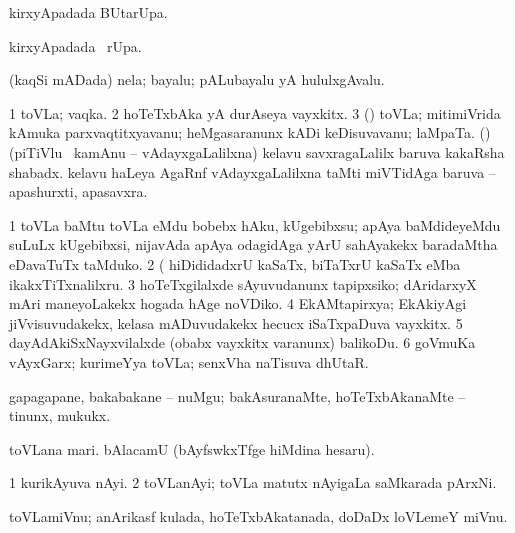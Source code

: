 \bentry
{} 
\gl{\kirx}
\expl{}
\bmng
{} kirxyApadada BUtarUpa. 
\emng
\eentry

\bentry
{} 
\gl{\kirx}
\expl{}
\bmng
{} kirxyApadada \BUkaq\ rUpa. 
\emng
\eentry

\bentry
{} 
\gl{\nA}
\expl{}
\bmng
(kaqSi mADada) nela; bayalu; pALubayalu yA hululxgAvalu. 
\emng
\eentry

\bentry
{} 
\gl{\nA}
\bmng
\bnum
\num{1} toVLa; vaqka. 
\num{2} hoTeTxbAka yA durAseya vayxkitx. 
\num{3} (\ashi) toVLa; mitimiVrida kAmuka parxvaqtitxyavanu; heMgasaranunx kADi keDisuvavanu; laMpaTa. 
 (\saM) 
\banum
{} (piTiVlu \mo\ kamAnu -- vAdayxgaLalilxna) kelavu savxragaLalilx baruva kakaRsha shabadx. 
 kelavu haLeya AgaRnf vAdayxgaLalilxna taMti miVTidAga baruva -- apashurxti, apasavxra. 
\eanum
\numie
\enum
\emng

\noindent
\gl{\pagu}
\expl{}
\bmng
\bnum
\num{1}  toVLa baMtu toVLa eMdu bobebx hAku, kUgebibxsu; apAya baMdideyeMdu suLuLx kUgebibxsi, nijavAda apAya odagidAga yArU sahAyakekx baradaMtha eDavaTuTx taMduko. 
\num{2}  (  hiDididadxrU kaSaTx, biTaTxrU kaSaTx eMba ikakxTiTxnalilxru. 
\num{3}  hoTeTxgilalxde sAyuvudanunx tapipxsiko; dAridarxyX mAri maneyoLakekx hogada hAge noVDiko. 
\num{4}  EkAMtapirxya; EkAkiyAgi jiVvisuvudakekx, kelasa mADuvudakekx hecucx iSaTxpaDuva vayxkitx. 
\num{5}  dayAdAkiSxNayxvilalxde (obabx vayxkitx \mo varanunx) balikoDu. 
\num{6}  goVmuKa vAyxGarx; kurimeYya toVLa; senxVha naTisuva dhUtaR. 
\enum
\emng
\eentry

\bentry
{} 
\gl{\sakirx}
\expl{}
\bmng
gapagapane, bakabakane -- nuMgu; bakAsuranaMte, hoTeTxbAkanaMte -- tinunx, mukukx. 
\emng
\eentry

\bentry
{} 
\gl{\nA}
\expl{}
\bmng
\banum
{} toVLana mari. 
 bAlacamU (bAyfswkxTfge hiMdina hesaru). 
\eanum
\emng
\eentry

\bentry
{} 
\gl{\nA}
\expl{}
\bmng
\bnum
\num{1} kurikAyuva nAyi. 
\num{2} toVLanAyi; toVLa matutx nAyigaLa saMkarada pArxNi. 
\enum
\emng
\eentry

\bentry
{} 
\gl{\nA}
\expl{}
\bmng
toVLamiVnu; anArikasf kulada, hoTeTxbAkatanada, doDaDx loVLemeY miVnu. 
\emng
\eentry

